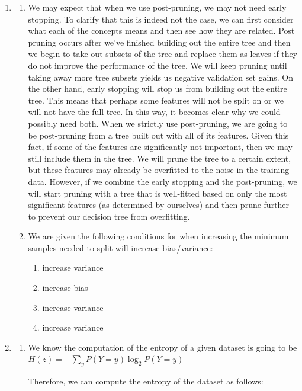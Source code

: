 \documentclass[12pt]{article}
\begin{document}
\begin{enumerate}
\item
  \begin{enumerate}
  \item We may expect that when we use post-pruning, we may not need early stopping. To clarify that this is indeed not the case, we can first consider what each of the concepts means and then see how they are related. Post pruning 
  occurs after we've finished building out the entire tree and then we begin to take out subsets of the tree and replace them as leaves if they do not improve the performance of the tree. We will keep pruning until taking away more tree subsets yields us negative validation set gains. On the other hand, early stopping will stop us from 
  building out the entire tree. This means that perhaps some features will not be split on or we will not have the full tree. In this way, it becomes clear why we could possibly need both. When we strictly use post-pruning, we are going to be post-pruning from a tree built out with all of its features. Given this fact, if some of the features are significantly not important, then we may still include them in the tree. We will prune the tree to a certain extent, but these features may already be overfitted to the noise in the training data. However, if we combine the early stopping and the post-pruning, we will start pruning with a tree that is well-fitted based on only the most significant features (as determined by ourselves) and then prune further to prevent our decision tree from overfitting.
  \item We are given the following conditions for when increasing the minimum samples needed to split will increase bias/variance: 
  
    \begin{enumerate}
      \item increase variance 
      \item increase bias 
      \item increase variance 
      \item increase variance
    \end{enumerate}

  \end{enumerate}

\item
  \begin{enumerate}
  \item We know the computation of the entropy of a given dataset is going to be $H(z) = -\sum_{y}P(Y=y)\log_2 P(Y=y)$
  
  Therefore, we can compute the entropy of the dataset as follows: \\ 


\end{enumerate}
\end{enumerate}
\end{document}
